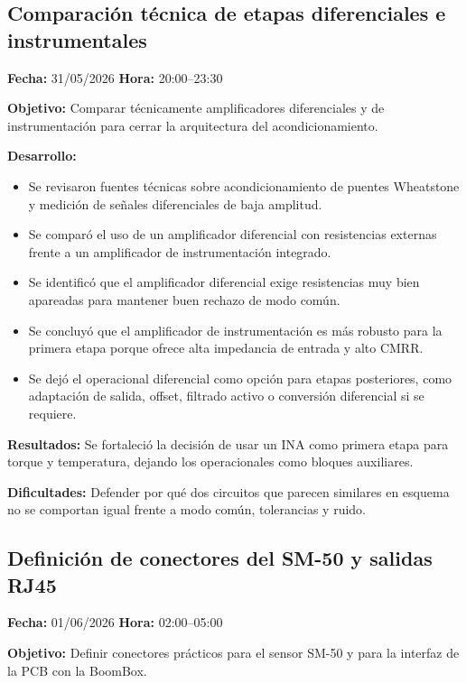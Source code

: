 \documentclass[12pt]{article}
\begin{document}
\subsection{Comparación técnica de etapas diferenciales e instrumentales}
\textbf{Fecha:} 31/05/2026 \quad \textbf{Hora:} 20:00--23:30

\textbf{Objetivo:}
Comparar técnicamente amplificadores diferenciales y de instrumentación para cerrar la arquitectura del acondicionamiento.

\textbf{Desarrollo:}
\begin{itemize}
\item Se revisaron fuentes técnicas sobre acondicionamiento de puentes Wheatstone y medición de señales diferenciales de baja amplitud.
\item Se comparó el uso de un amplificador diferencial con resistencias externas frente a un amplificador de instrumentación integrado.
\item Se identificó que el amplificador diferencial exige resistencias muy bien apareadas para mantener buen rechazo de modo común.
\item Se concluyó que el amplificador de instrumentación es más robusto para la primera etapa porque ofrece alta impedancia de entrada y alto CMRR.
\item Se dejó el operacional diferencial como opción para etapas posteriores, como adaptación de salida, offset, filtrado activo o conversión diferencial si se requiere.
\end{itemize}

\textbf{Resultados:}
Se fortaleció la decisión de usar un INA como primera etapa para torque y temperatura, dejando los operacionales como bloques auxiliares.

\textbf{Dificultades:}
Defender por qué dos circuitos que parecen similares en esquema no se comportan igual frente a modo común, tolerancias y ruido.

\subsection{Definición de conectores del SM-50 y salidas RJ45}
\textbf{Fecha:} 01/06/2026 \quad \textbf{Hora:} 02:00--05:00

\textbf{Objetivo:}
Definir conectores prácticos para el sensor SM-50 y para la interfaz de la PCB con la BoomBox.
\end{document}
